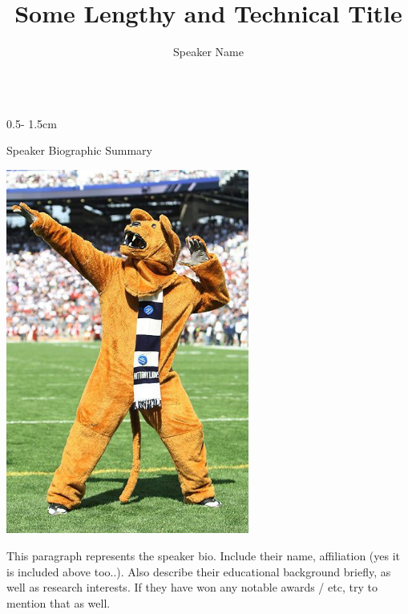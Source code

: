 \documentclass{psuposter}
\title{Some Lengthy and Technical Title}
\author
{%
    Speaker Name\inst{1}
}
\institute
{
    \inst{1} University of Speaker, Department of Speaker
}
\begin{document}
\begin{frame}
\begin{columns}[onlytextwidth]


\begin{column}{0.5\textwidth - 1.5cm}
    \begin{block}{Speaker Biographic Summary}
    	\begin{center}
	    	\includegraphics[width=0.6\textwidth]{psuposter-images/lion}    		
    	\end{center}
        This paragraph represents the speaker bio. Include their name, affiliation (yes it is included above too..). Also describe their educational background briefly, as well as research interests. If they have won any notable awards / etc, try to mention that as well.
    \end{block}
%
%
%


\end{column}
\end{columns}
\end{frame}
\end{document}
